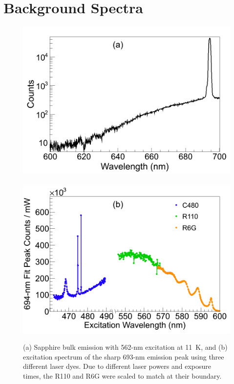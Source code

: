 \section{Background Spectra}
\label{sec:bgs} %

\begin{figure} %
        \centering
                \includegraphics[width=.5\textwidth]{figures/Cr_a.png}
                ~
                \includegraphics[width=.5\textwidth]{figures/Cr_b.png}
                \caption{(a) Sapphire bulk emission with 562-nm excitation at 11~K, and (b) excitation spectrum of the sharp 693-nm emission peak using three different laser dyes.  Due to different laser powers and exposure times, the R110 and R6G were scaled to match at their boundary.}
\label{fig:Cr}
\end{figure}

